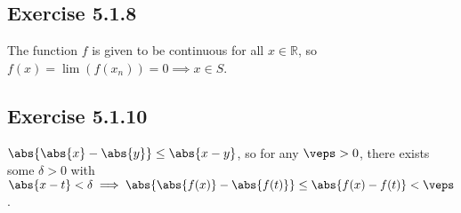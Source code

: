 \documentclass[11pt]{article}
\newcommand{\bbR}{\mathbb{R}}  %
\begin{document}
    \subsection*{Exercise 5.1.8}
    The function $f$ is given to be continuous for all $x\in\bbR$, so $f(x)=\lim(f(x_n))=0 \implies x\in S$.

    \subsection*{Exercise 5.1.10}
    $\abs{\abs{x}-\abs{y}}\leq \abs{x-y}$, so for any $\veps > 0$, there exists some $\delta >0$ with $\abs{x-t}<\delta\implies \abs{\abs{f(x)}-\abs{f(t)}}\leq\abs{f(x)-f(t)}<\veps$.
\end{document}
